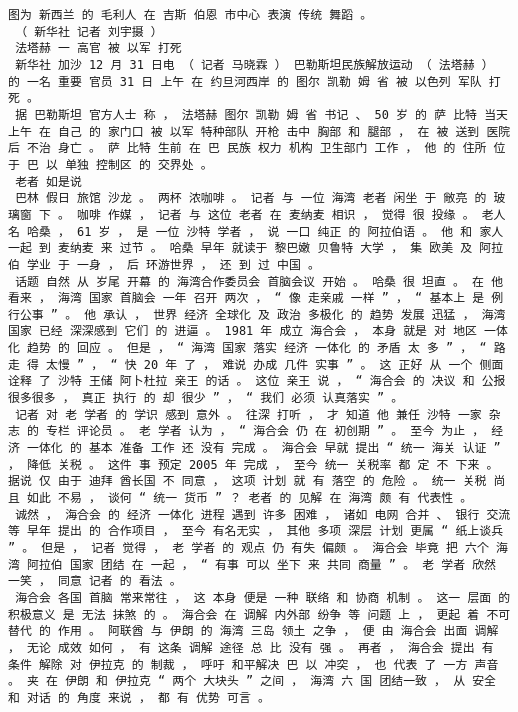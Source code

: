 \documentclass{article}
\begin{document}
\begin{Verbatim}[commandchars=\\\{\}]
 图为 新西兰 的 毛利人 在 吉斯 伯恩 市中心 表演 传统 舞蹈 。 
 （ 新华社 记者 刘宇摄 ） 
 法塔赫 一 高官 被 以军 打死 
 新华社 加沙 12 月 31 日电 （ 记者 马晓霖 ） 巴勒斯坦民族解放运动 （ 法塔赫 ） 的 一名 重要 官员 31 日 上午 在 约旦河西岸 的 图尔 凯勒 姆 省 被 以色列 军队 打死 。 
 据 巴勒斯坦 官方人士 称 ， 法塔赫 图尔 凯勒 姆 省 书记 、 50 岁 的 萨 比特 当天 上午 在 自己 的 家门口 被 以军 特种部队 开枪 击中 胸部 和 腿部 ， 在 被 送到 医院 后 不治 身亡 。 萨 比特 生前 在 巴 民族 权力 机构 卫生部门 工作 ， 他 的 住所 位于 巴 以 单独 控制区 的 交界处 。 
 老者 如是说 
 巴林 假日 旅馆 沙龙 。 两杯 浓咖啡 。 记者 与 一位 海湾 老者 闲坐 于 敞亮 的 玻璃窗 下 。 咖啡 作媒 ， 记者 与 这位 老者 在 麦纳麦 相识 ， 觉得 很 投缘 。 老人 名 哈桑 ， 61 岁 ， 是 一位 沙特 学者 ， 说 一口 纯正 的 阿拉伯语 。 他 和 家人 一起 到 麦纳麦 来 过节 。 哈桑 早年 就读于 黎巴嫩 贝鲁特 大学 ， 集 欧美 及 阿拉伯 学业 于 一身 ， 后 环游世界 ， 还 到 过 中国 。 
 话题 自然 从 岁尾 开幕 的 海湾合作委员会 首脑会议 开始 。 哈桑 很 坦直 。 在 他 看来 ， 海湾 国家 首脑会 一年 召开 两次 ， “ 像 走亲戚 一样 ” ， “ 基本上 是 例行公事 ” 。 他 承认 ， 世界 经济 全球化 及 政治 多极化 的 趋势 发展 迅猛 ， 海湾 国家 已经 深深感到 它们 的 进逼 。 1981 年 成立 海合会 ， 本身 就是 对 地区 一体化 趋势 的 回应 。 但是 ， “ 海湾 国家 落实 经济 一体化 的 矛盾 太 多 ” ， “ 路 走 得 太慢 ” ， “ 快 20 年 了 ， 难说 办成 几件 实事 ” 。 这 正好 从 一个 侧面 诠释 了 沙特 王储 阿卜杜拉 亲王 的话 。 这位 亲王 说 ， “ 海合会 的 决议 和 公报 很多很多 ， 真正 执行 的 却 很少 ” ， “ 我们 必须 认真落实 ” 。 
 记者 对 老 学者 的 学识 感到 意外 。 往深 打听 ， 才 知道 他 兼任 沙特 一家 杂志 的 专栏 评论员 。 老 学者 认为 ， “ 海合会 仍 在 初创期 ” 。 至今 为止 ， 经济 一体化 的 基本 准备 工作 还 没有 完成 。 海合会 早就 提出 “ 统一 海关 认证 ” ， 降低 关税 。 这件 事 预定 2005 年 完成 ， 至今 统一 关税率 都 定 不 下来 。 据说 仅 由于 迪拜 酋长国 不 同意 ， 这项 计划 就 有 落空 的 危险 。 统一 关税 尚且 如此 不易 ， 谈何 “ 统一 货币 ” ？ 老者 的 见解 在 海湾 颇 有 代表性 。 
 诚然 ， 海合会 的 经济 一体化 进程 遇到 许多 困难 ， 诸如 电网 合并 、 银行 交流 等 早年 提出 的 合作项目 ， 至今 有名无实 ， 其他 多项 深层 计划 更属 “ 纸上谈兵 ” 。 但是 ， 记者 觉得 ， 老 学者 的 观点 仍 有失 偏颇 。 海合会 毕竟 把 六个 海湾 阿拉伯 国家 团结 在 一起 ， “ 有事 可以 坐下 来 共同 商量 ” 。 老 学者 欣然 一笑 ， 同意 记者 的 看法 。 
 海合会 各国 首脑 常来常往 ， 这 本身 便是 一种 联络 和 协商 机制 。 这一 层面 的 积极意义 是 无法 抹煞 的 。 海合会 在 调解 内外部 纷争 等 问题 上 ， 更起 着 不可 替代 的 作用 。 阿联酋 与 伊朗 的 海湾 三岛 领土 之争 ， 便 由 海合会 出面 调解 ， 无论 成效 如何 ， 有 这条 调解 途径 总 比 没有 强 。 再者 ， 海合会 提出 有 条件 解除 对 伊拉克 的 制裁 ， 呼吁 和平解决 巴 以 冲突 ， 也 代表 了 一方 声音 。 夹 在 伊朗 和 伊拉克 “ 两个 大块头 ” 之间 ， 海湾 六 国 团结一致 ， 从 安全 和 对话 的 角度 来说 ， 都 有 优势 可言 。 

\end{Verbatim}
\end{document}

